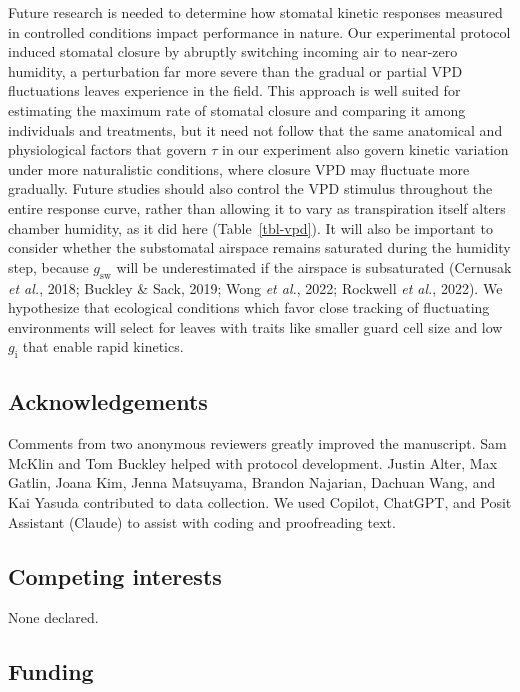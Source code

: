 \documentclass[
  letterpaper,
  DIV=11,
  numbers=noendperiod]{scrartcl}
\newcommand{\gi}{$g_\mathrm{i}$}
\newcommand{\gsw}{$g_\mathrm{sw}$}
\begin{document}
Future research is needed to determine how stomatal kinetic responses
measured in controlled conditions impact performance in nature. Our
experimental protocol induced stomatal closure by abruptly switching
incoming air to near-zero humidity, a perturbation far more severe than
the gradual or partial VPD fluctuations leaves experience in the field.
This approach is well suited for estimating the maximum rate of stomatal
closure and comparing it among individuals and treatments, but it need
not follow that the same anatomical and physiological factors that
govern \(\tau\) in our experiment also govern kinetic variation under
more naturalistic conditions, where closure VPD may fluctuate more
gradually. Future studies should also control the VPD stimulus
throughout the entire response curve, rather than allowing it to vary as
transpiration itself alters chamber humidity, as it did here
(Table~\ref{tbl-vpd}). It will also be important to consider whether the
substomatal airspace remains saturated during the humidity step, because
\gsw{} will be underestimated if the airspace is subsaturated (Cernusak
\emph{et al.}, 2018; Buckley \& Sack, 2019; Wong \emph{et al.}, 2022;
Rockwell \emph{et al.}, 2022). We hypothesize that ecological conditions
which favor close tracking of fluctuating environments will select for
leaves with traits like smaller guard cell size and low \gi{} that
enable rapid kinetics.

\subsection{Acknowledgements}\label{acknowledgements}

Comments from two anonymous reviewers greatly improved the manuscript.
Sam McKlin and Tom Buckley helped with protocol development. Justin
Alter, Max Gatlin, Joana Kim, Jenna Matsuyama, Brandon Najarian, Dachuan
Wang, and Kai Yasuda contributed to data collection. We used Copilot,
ChatGPT, and Posit Assistant (Claude) to assist with coding and
proofreading text.

\subsection{Competing interests}\label{competing-interests}

None declared.

\subsection{Funding}\label{funding}
\end{document}
